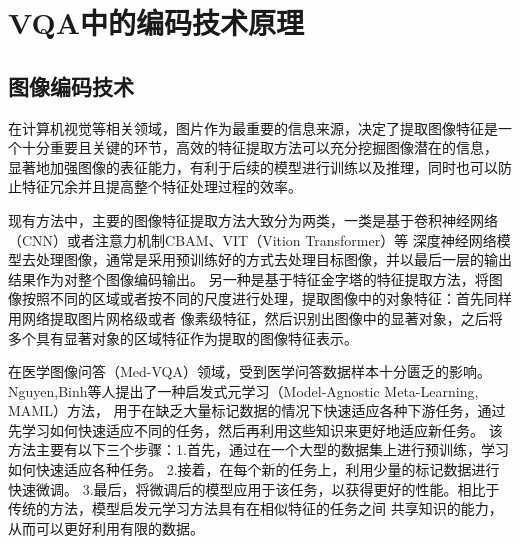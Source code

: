 \section{VQA中的编码技术原理}
\subsection{图像编码技术}
在计算机视觉等相关领域，图片作为最重要的信息来源，决定了提取图像特征是一个十分重要且关键的环节，高效的特征提取方法可以充分挖掘图像潜在的信息，
显著地加强图像的表征能力，有利于后续的模型进行训练以及推理，同时也可以防止特征冗余并且提高整个特征处理过程的效率。
 
现有方法中，主要的图像特征提取方法大致分为两类，一类是基于卷积神经网络（CNN）或者注意力机制CBAM、VIT（Vition Transformer）等
深度神经网络模型去处理图像，通常是采用预训练好的方式去处理目标图像，并以最后一层的输出结果作为对整个图像编码输出。
另一种是基于特征金字塔的特征提取方法，将图像按照不同的区域或者按不同的尺度进行处理，提取图像中的对象特征：首先同样用网络提取图片网格级或者
像素级特征，然后识别出图像中的显著对象，之后将多个具有显著对象的区域特征作为提取的图像特征表示。

在医学图像问答（Med-VQA）领域，受到医学问答数据样本十分匮乏的影响。Nguyen,Binh等人提出了一种启发式元学习（Model-Agnostic Meta-Learning, MAML）\cite{nguyen2019overcoming}方法，
用于在缺乏大量标记数据的情况下快速适应各种下游任务，通过先学习如何快速适应不同的任务，然后再利用这些知识来更好地适应新任务。
该方法主要有以下三个步骤：1.首先，通过在一个大型的数据集上进行预训练，学习如何快速适应各种任务。
2.接着，在每个新的任务上，利用少量的标记数据进行快速微调。
3.最后，将微调后的模型应用于该任务，以获得更好的性能。相比于传统的方法，模型启发元学习方法具有在相似特征的任务之间
共享知识的能力，从而可以更好利用有限的数据。

